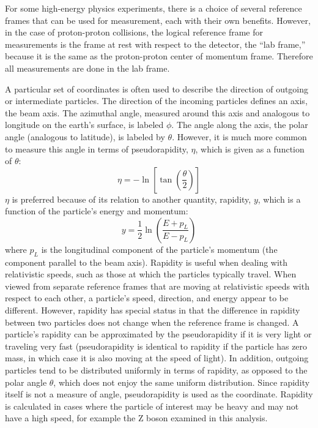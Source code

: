 
For some high-energy physics experiments, 
there is a choice of several reference 
frames that can be used for measurement, 
each with their own benefits.  
However, in the case of proton-proton collisions, 
the logical reference frame for measurements is 
the frame at rest with respect to the detector, 
the ``lab frame,'' 
because it is the same as the 
proton-proton center of momentum frame.  
Therefore all measurements are done 
in the lab frame.  



A particular set of coordinates is often used to describe 
the direction of outgoing or intermediate particles.  
The direction of the incoming particles defines an axis, 
the beam axis.  
The azimuthal angle, measured around this axis 
and analogous to longitude on the earth's surface, 
is labeled $\phi$.  
The angle along the axis, the polar angle 
(analogous to latitude), 
is labeled by $\theta$.  
However, it is much more common to measure this 
angle in terms of pseudorapidity, $\eta$, 
which is given as a function of $\theta$:
\[
\eta = -\ln \left[ \tan \left( \frac{\theta}{2}\right) \right]
\]
$\eta$ is preferred because of its relation to another quantity, 
rapidity, $y$, which is a function of the particle's 
energy and momentum:
\[
y = \frac{1}{2} \ln \left( \frac{E+p_L}{E-p_L} \right)
\]
where $p_L$ is the longitudinal component of the 
particle's momentum (the component parallel to the beam axis).  
Rapidity is useful when dealing with relativistic speeds, 
such as those at which the particles typically travel.  
When viewed from separate reference frames that are moving 
at relativistic speeds with respect to each other, 
a particle's speed, direction, and energy appear to be different.  
However, rapidity has special status in that the 
difference in rapidity 
between two particles does not change 
when the reference frame is changed.  
A particle's rapidity can be approximated by the 
pseudorapidity if it is very light or 
traveling very fast 
(pseudorapidity is identical to rapidity 
if the particle has zero mass, 
in which case it is also 
moving at the speed of light).  
In addition, outgoing particles tend to be 
distributed uniformly in terms of rapidity, 
as opposed to the polar angle $\theta$, 
which does not enjoy the same uniform distribution. 
Since rapidity itself is not a measure of angle, 
pseudorapidity is used as the coordinate.  
Rapidity is calculated in cases 
where the particle of interest may be heavy 
and may not have a high speed, 
for example the Z boson examined in this analysis.  

